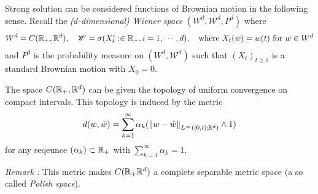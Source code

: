 \documentclass[12pt,a4paper]{article}
\begin{document}
Strong solution can be considered functions of Brownian motion in the following sense. Recall the \emph{($d$-dimensional) Wiener space} $(W^d, \mathscr{W}^d, P^d)$ where
\begin{align*}
W^d = C(\mathbb{R}_+, \mathbb{R}^d), \quad \mathscr{W} = \sigma(X_t^i : \in \mathbb{R}_+, i=1, \cdots, d), \quad \text{where }X_t(w) = w(t) \text{ for } w\in W^d
\end{align*}
and $P^d$ is the probability measure on $(W^d, \mathscr{W}^d)$ such that $(X_t)_{t\geq 0}$ is a standard Brownian motion with $X_0 =0$.

\quad The space $C(\mathbb{R}_+, \mathbb{R}^d)$ can be given the topology of uniform convergence on compact intervals. This topology is induced by the metric
\begin{align*}
d(w, \tilde{w}) = \sum_{k=1}^{\infty} \alpha_k (\snorms{w - \tilde{w}}{L^{\infty}([0, t];\reals^d)} \wedge 1)
\end{align*}
for any seqeunce $(\alpha_k) \subset \mathbb{R}_+$ with $\sum_{k=1}^{\infty} \alpha_k =1$. 
\s

\emph{Remark :} This metric makes $C(\mathbb{R}_+ \mathbb{R}^d)$ a complete separable metric space (a so called \emph{Polish space}).
\s
\end{document}

